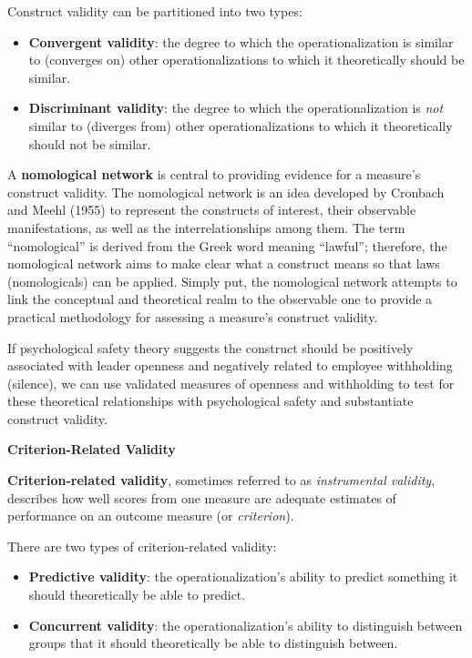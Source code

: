 \documentclass[
]{book}
\providecommand{\tightlist}{%
  \setlength{\itemsep}{0pt}\setlength{\parskip}{0pt}}
\begin{document}
Construct validity can be partitioned into two types:

\begin{itemize}
\tightlist
\item
  \textbf{Convergent validity}: the degree to which the operationalization is similar to (converges on) other operationalizations to which it theoretically should be similar.
\item
  \textbf{Discriminant validity}: the degree to which the operationalization is \emph{not} similar to (diverges from) other operationalizations to which it theoretically should not be similar.
\end{itemize}

A \textbf{nomological network} is central to providing evidence for a measure's construct validity. The nomological network is an idea developed by Cronbach and Meehl (1955) to represent the constructs of interest, their observable manifestations, as well as the interrelationships among them. The term ``nomological'' is derived from the Greek word meaning ``lawful''; therefore, the nomological network aims to make clear what a construct means so that laws (nomologicals) can be applied. Simply put, the nomological network attempts to link the conceptual and theoretical realm to the observable one to provide a practical methodology for assessing a measure's construct validity.

If psychological safety theory suggests the construct should be positively associated with leader openness and negatively related to employee withholding (silence), we can use validated measures of openness and withholding to test for these theoretical relationships with psychological safety and substantiate construct validity.

\textbf{Criterion-Related Validity}

\textbf{Criterion-related validity}, sometimes referred to as \emph{instrumental validity}, describes how well scores from one measure are adequate estimates of performance on an outcome measure (or \emph{criterion}).

There are two types of criterion-related validity:

\begin{itemize}
\tightlist
\item
  \textbf{Predictive validity}: the operationalization's ability to predict something it should theoretically be able to predict.
\item
  \textbf{Concurrent validity}: the operationalization's ability to distinguish between groups that it should theoretically be able to distinguish between.
\end{itemize}
\end{document}
